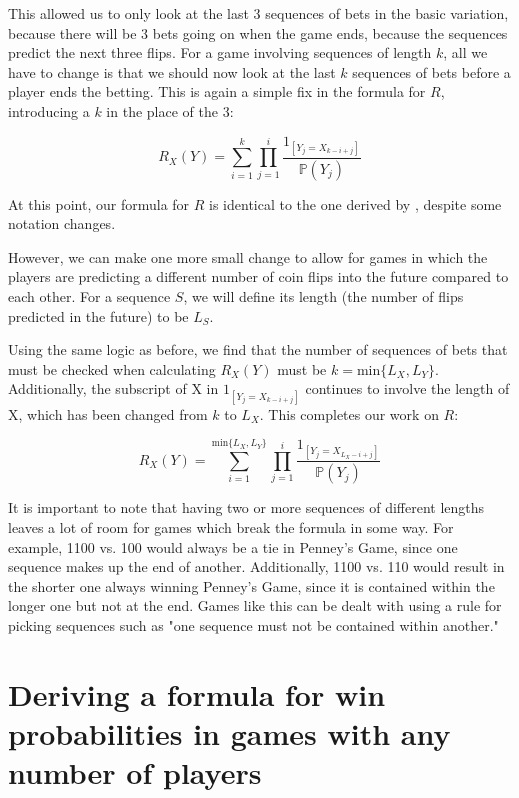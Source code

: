 \documentclass[english,12pt,a4paper,final]{article}
\begin{document}
This allowed us to only look at the last 3 sequences of bets in the basic variation, because there will be 3 bets going on when the game ends, because the sequences predict the next three flips. For a game involving sequences of length $k$, all we have to change is that we should now look at the last $k$ sequences of bets before a player ends the betting. This is again a simple fix in the formula for $R$, introducing a $k$ in the place of the 3:

\begin{equation}\label{RanyLength}
	R_X(Y) = \sum_{i=1}^{k} \prod_{j=1}^{i} \frac{1_{[Y_j = X_{k-i+j}]}}{\mathbb{P}(Y_j)}
\end{equation}

At this point, our formula for $R$ is identical to the one derived by \textcite{miller}, despite some notation changes.

However, we can make one more small change to allow for games in which the players are predicting a different number of coin flips into the future compared to each other. For a sequence $S$, we will define its length (the number of flips predicted in the future) to be $L_S$.

Using the same logic as before, we find that the number of sequences of bets that must be checked when calculating $R_X(Y)$ must be $k = \text{min}\{L_X, L_Y\}$. Additionally, the subscript of X in $1_{[Y_j = X_{k-i+j}]}$ continues to involve the length of X, which has been changed from $k$ to $L_X$. This completes our work on $R$:

\begin{equation}\label{Rdef}
	R_{X}(Y) = \sum_{i=1}^{\text{min}\{L_{X}, L_{Y}\}} \prod_{j=1}^{i} \frac{1_{[Y_{j} = X_{L_{X} - i + j}]}}{\mathbb{P}(Y_{j})}
\end{equation}

It is important to note that having two or more sequences of different lengths leaves a lot of room for games which break the formula in some way. For example, 1100 vs. 100 would always be a tie in Penney's Game, since one sequence makes up the end of another. Additionally, 1100 vs. 110 would result in the shorter one always winning Penney's Game, since it is contained within the longer one but not at the end. Games like this can be dealt with using a rule for picking sequences such as "one sequence must not be contained within another."

\part{Deriving a formula for win probabilities in games with any number of players}
\end{document}
